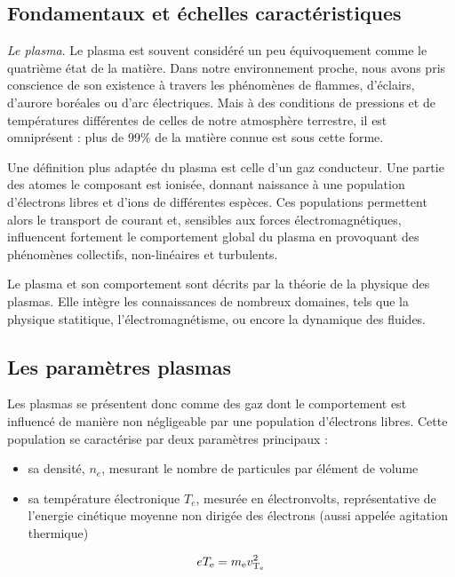 \label{Introduction}
\begin{refsection}

\section{Fondamentaux et échelles caractéristiques}
\emph{Le plasma}. Le plasma est souvent considéré un peu équivoquement comme le
quatrième état de la matière. Dans notre environnement proche, nous avons pris
conscience de son existence à travers les phénomènes de flammes, d'éclairs,
d'aurore boréales ou d'arc électriques. Mais à des conditions de pressions et de
températures différentes de celles de notre atmosphère terrestre, il est
omniprésent : plus de 99\% de la matière connue est sous cette forme.

Une définition plus adaptée du plasma est celle d'un gaz conducteur. Une partie
des atomes le composant est ionisée, donnant naissance à une population
d'électrons libres et d'ions de différentes espèces. Ces populations permettent
alors le transport de courant et, sensibles aux forces électromagnétiques,
influencent fortement le comportement global du plasma en provoquant des
phénomènes collectifs, non-linéaires et turbulents.

Le plasma et son comportement sont décrits par la théorie de la physique des
plasmas. Elle intègre les connaissances de nombreux domaines, tels que la
physique statitique, l'électromagnétisme, ou encore la dynamique des fluides.

\subsection{Les paramètres plasmas}
Les plasmas se présentent donc comme des gaz dont le comportement est influencé
de manière non négligeable par une population d'électrons libres. Cette population
se caractérise par deux paramètres principaux :

\begin{itemize}
  \item sa densité, $n_e$, mesurant le nombre de particules par élément de volume
  \item sa température électronique $T_e$, mesurée en électronvolts, représentative
   de l'energie cinétique moyenne non dirigée des électrons (aussi appelée
   agitation thermique)
\end{itemize}

\begin{equation}
	eT_\text{e}=m_\text{e} v_{\text{T}_\text{e}}^{{2}}
\end{equation}


\end{refsection}

